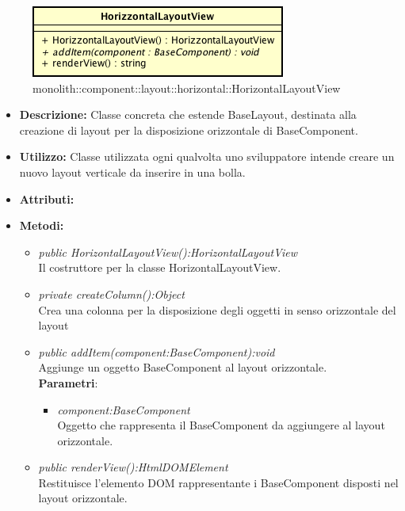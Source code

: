 \label{monolith::component::layout::horizontal::HorizontalLayoutView}
\begin{figure}[H]
	\centering
	\includegraphics[scale=0.5]{Sezioni/SottosezioniST/img/HorizontalLayoutView.png}
	\caption{monolith::component::layout::horizontal::HorizontalLayoutView}
\end{figure}

\begin{itemize}
\item \textbf{Descrizione:} Classe concreta che estende BaseLayout, destinata alla creazione di layout  per la disposizione orizzontale di BaseComponent.
\item \textbf{Utilizzo:} Classe utilizzata ogni qualvolta uno sviluppatore intende creare un nuovo layout verticale da inserire in una bolla.
\item \textbf{Attributi:}
\item \textbf{Metodi:}
\begin{itemize}
\item\textit{public HorizontalLayoutView():HorizontalLayoutView}\\
Il costruttore per la classe HorizontalLayoutView.
\item \textit{private createColumn():Object}\\
Crea una colonna per la disposizione degli oggetti in senso orizzontale del layout
\item \textit{public addItem(component:BaseComponent):void}\\
Aggiunge un oggetto BaseComponent al layout orizzontale.
\\ \textbf{Parametri}: \begin{itemize}
\item \textit{component:BaseComponent}\\
Oggetto che rappresenta il BaseComponent da aggiungere al layout orizzontale.
\end{itemize}
\item \textit{public renderView():HtmlDOMElement}\\
Restituisce l'elemento DOM rappresentante i BaseComponent disposti nel layout orizzontale.
\end{itemize}
\end{itemize}